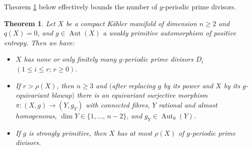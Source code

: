 \documentclass[11pt,a4paper,psamsfonts]{amsart}
\theoremstyle{plain}
\newtheorem{theorem}[thm]{Theorem}
\theoremstyle{definition}
\theoremstyle{remark}
\begin{document}
Theorem \ref{stabD} below effectively bounds the number of $g$-periodic prime divisors.

\begin{theorem}\label{stabD}
Let $X$ be a
compact K\"ahler
manifold of dimension $n \ge 2$ and $q(X) = 0$, and $g \in {\operatorname{Aut}}(X)$
a weakly primitive automorphism of positive entropy.
Then we have:
\begin{itemize}
\item[(1)]
$X$ has none or only finitely many $g$-periodic prime divisors
$D_i$ $(1 \le i \le  r; \, r \ge 0)$.
\item[(2)]
If $r > \rho(X)$, then $n \ge 3$ and $($after replacing $g$ by its power
and $X$ by its $g$-equivariant blowup$)$ there is an equivariant surjective
morphism $\pi: (X, g) \to (Y, g_Y)$ with connected fibres,
$Y$ rational and almost homogeneous,
$\dim Y \in \{1, \dots, \, n-2\}$, and $g_Y \in {\operatorname{Aut}}_0(Y)$.
\item[(3)]
If $g$ is strongly primitive, then
$X$ has at most $\rho(X)$ of $g$-periodic prime divisors.
\end{itemize}
\end{theorem}
\end{document}
